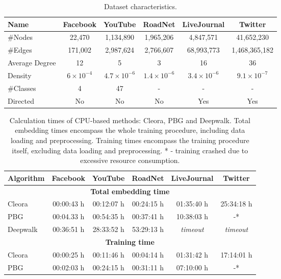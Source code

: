 \documentclass{IEEEtran}
\begin{document}
 \begin{table*}
\small
\centering
\begin{tabular}{ l|c|c|c|c|c } 
 \hline

 Name & \textbf{Facebook} & \textbf{YouTube} & \textbf{RoadNet} & \textbf{LiveJournal} & \textbf{Twitter} \\\hline
 \#Nodes & 22,470 & 1,134,890 & 1,965,206 & 4,847,571 & 41,652,230 \\ 
 \#Edges & 171,002 & 2,987,624 & 2,766,607 & 68,993,773 & 1,468,365,182 \\ 
 Average Degree & 12 & 5 & 3 & 16 & 36 \\
 Density & $6\times10^{-4}$ & $4.7\times10^{-6}$ & $1.4\times10^{-6}$ & $3.4\times10^{-6}$ & $9.1\times10^{-7}$\\
 \#Classes & 4 & 47 & - & - & - \\
 Directed & No & No & No & Yes & Yes \\
 \hline
\end{tabular}
\caption{Dataset characteristics.}
\label{datasets}
\end{table*}

\begin{table*}
\small
\centering
\begin{tabular}{ l|c|c|c|c|c } 
 \hline
 Algorithm & \textbf{Facebook} & \textbf{YouTube} & \textbf{RoadNet} & \textbf{LiveJournal} & \textbf{Twitter} \\\hline
  \multicolumn{6}{c}{\textbf{Total embedding time}} \\\hline
 Cleora & 00:00:43 h & 00:12:07 h & 00:24:15 h & 01:35:40 h  & 25:34:18 h \\ 
 PBG & 00:04.33 h & 00:54:35 h & 00:37:41 h &  10:38:03 h & -* \\
 Deepwalk & 00:36:51 h & 28:33:52 h & 53:29:13 h & \textit{timeout} & \textit{timeout} \\ 
\hline
 \multicolumn{6}{c}{\textbf{Training time}} \\ \hline
 Cleora & 00:00:25 h & 00:11:46 h & 00:04:14 h & 01:31:42 h & 17:14:01 h \\ 
 PBG & 00:02:03 h & 00:24:15 h & 00:31:11 h & 07:10:00 h & -* \\
 \hline
\end{tabular}
\caption{Calculation times of CPU-based methods: Cleora, PBG and Deepwalk. Total embedding times encompass the whole training procedure, including data loading and preprocessing. Training times encompass the training procedure itself, excluding data loading and preprocessing. * - training crashed due to excessive resource consumption.}
\label{training-time}
\end{table*}
 
\end{document}

